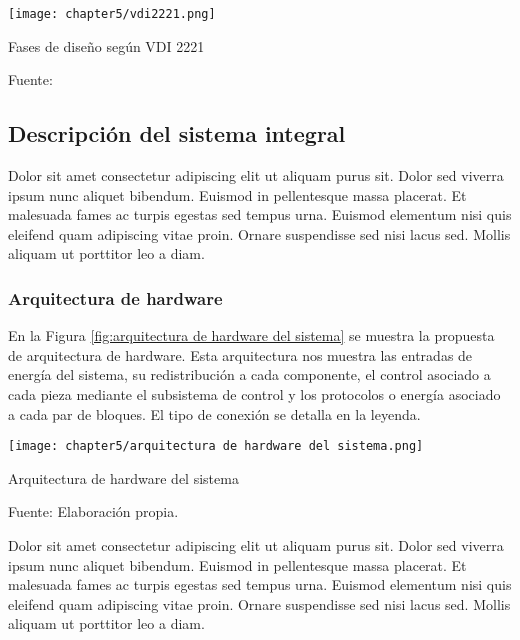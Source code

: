 \begin{myfigure}[H]
	\centering
	\texttt{[image: chapter5/vdi2221.png]}
	\caption{Fases de diseño según VDI 2221}
	\begin{myflushleftportland}
		Fuente: \cite{Pahl2007}
	\end{myflushleftportland}
	\label{fig:vdi2221}
\end{myfigure}



\subsection{Descripción del sistema integral}
\label{ssec:descripcion del sistema integral}

Dolor sit amet consectetur adipiscing elit ut aliquam purus sit. Dolor sed viverra ipsum nunc aliquet bibendum. Euismod in pellentesque massa placerat. Et malesuada fames ac turpis egestas sed tempus urna. Euismod elementum nisi quis eleifend quam adipiscing vitae proin. Ornare suspendisse sed nisi lacus sed. Mollis aliquam ut porttitor leo a diam.

\subsubsection{Arquitectura de hardware}

En la Figura \ref{fig:arquitectura de hardware del sistema} se muestra la propuesta de arquitectura de hardware. Esta arquitectura nos muestra las entradas de energía del sistema, su redistribución a cada componente, el control asociado a cada pieza mediante el subsistema de control y los protocolos o energía asociado a cada par de bloques. El tipo de conexión se detalla en la leyenda.

\begin{myfigure}[H]
	\centering
	\texttt{[image: chapter5/arquitectura de hardware del sistema.png]}
	\caption{Arquitectura de hardware del sistema}
	\begin{myflushleftportland}
		Fuente: Elaboración propia.
	\end{myflushleftportland}
	\label{fig:arquitectura de hardware del sistema}
\end{myfigure}


Dolor sit amet consectetur adipiscing elit ut aliquam purus sit. Dolor sed viverra ipsum nunc aliquet bibendum. Euismod in pellentesque massa placerat. Et malesuada fames ac turpis egestas sed tempus urna. Euismod elementum nisi quis eleifend quam adipiscing vitae proin. Ornare suspendisse sed nisi lacus sed. Mollis aliquam ut porttitor leo a diam.

